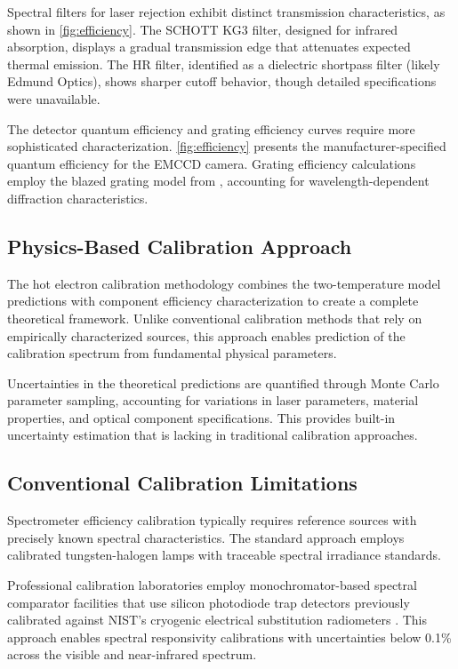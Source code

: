 \documentclass[
	parskip=half,
	a4paper,
]{scrarticle}
\begin{document}
Spectral filters for laser rejection exhibit distinct transmission characteristics, as shown in \autoref{fig:efficiency}. The SCHOTT KG3 filter, designed for infrared absorption, displays a gradual transmission edge that attenuates expected thermal emission. The HR filter, identified as a dielectric shortpass filter (likely Edmund Optics), shows sharper cutoff behavior, though detailed specifications were unavailable.

The detector quantum efficiency and grating efficiency curves require more sophisticated characterization. \autoref{fig:efficiency} presents the manufacturer-specified quantum efficiency for the EMCCD camera. Grating efficiency calculations employ the blazed grating model from \cite{barker_ripple_1984}, accounting for wavelength-dependent diffraction characteristics.

\subsection{Physics-Based Calibration Approach}
The hot electron calibration methodology combines the two-temperature model predictions with component efficiency characterization to create a complete theoretical framework. Unlike conventional calibration methods that rely on empirically characterized sources, this approach enables prediction of the calibration spectrum from fundamental physical parameters.

Uncertainties in the theoretical predictions are quantified through Monte Carlo parameter sampling, accounting for variations in laser parameters, material properties, and optical component specifications. This provides built-in uncertainty estimation that is lacking in traditional calibration approaches.

\subsection{Conventional Calibration Limitations}
Spectrometer efficiency calibration typically requires reference sources with precisely known spectral characteristics. The standard approach employs calibrated tungsten-halogen lamps with traceable spectral irradiance standards.

Professional calibration laboratories employ monochromator-based spectral comparator facilities that use silicon photodiode trap detectors previously calibrated against NIST's cryogenic electrical substitution radiometers \cite{houston_achievement_2022,larason_nist_1996}. This approach enables spectral responsivity calibrations with uncertainties below 0.1\% across the visible and near-infrared spectrum.
\end{document}
